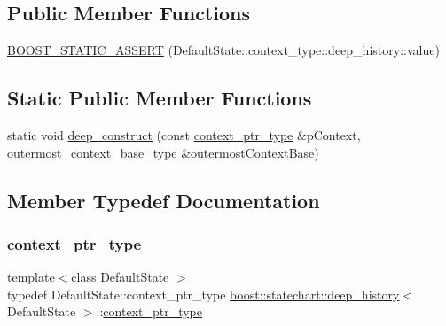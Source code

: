 \subsection*{Public Member Functions}
\begin{DoxyCompactItemize}
\item 
\mbox{\hyperlink{classboost_1_1statechart_1_1deep__history_aae02393ac5f3ab2377e4d1c39ab5bc78}{B\+O\+O\+S\+T\+\_\+\+S\+T\+A\+T\+I\+C\+\_\+\+A\+S\+S\+E\+RT}} (Default\+State\+::context\+\_\+type\+::deep\+\_\+history\+::value)
\end{DoxyCompactItemize}
\subsection*{Static Public Member Functions}
\begin{DoxyCompactItemize}
\item 
static void \mbox{\hyperlink{classboost_1_1statechart_1_1deep__history_ae8d6ba724135797f6d0b29139f257aa2}{deep\+\_\+construct}} (const \mbox{\hyperlink{classboost_1_1statechart_1_1deep__history_a0b936dd258f9807e4f3901096c289033}{context\+\_\+ptr\+\_\+type}} \&p\+Context, \mbox{\hyperlink{classboost_1_1statechart_1_1deep__history_a2ce3a43f840db416420a3073071c22cc}{outermost\+\_\+context\+\_\+base\+\_\+type}} \&outermost\+Context\+Base)
\end{DoxyCompactItemize}


\subsection{Member Typedef Documentation}
\mbox{\label{classboost_1_1statechart_1_1deep__history_a0b936dd258f9807e4f3901096c289033}} 
\subsubsection{\texorpdfstring{context\+\_\+ptr\+\_\+type}{context\_ptr\_type}}
{\footnotesize\ttfamily template$<$class Default\+State $>$ \\
typedef Default\+State\+::context\+\_\+ptr\+\_\+type \mbox{\hyperlink{classboost_1_1statechart_1_1deep__history}{boost\+::statechart\+::deep\+\_\+history}}$<$ Default\+State $>$\+::\mbox{\hyperlink{classboost_1_1statechart_1_1deep__history_a0b936dd258f9807e4f3901096c289033}{context\+\_\+ptr\+\_\+type}}}


